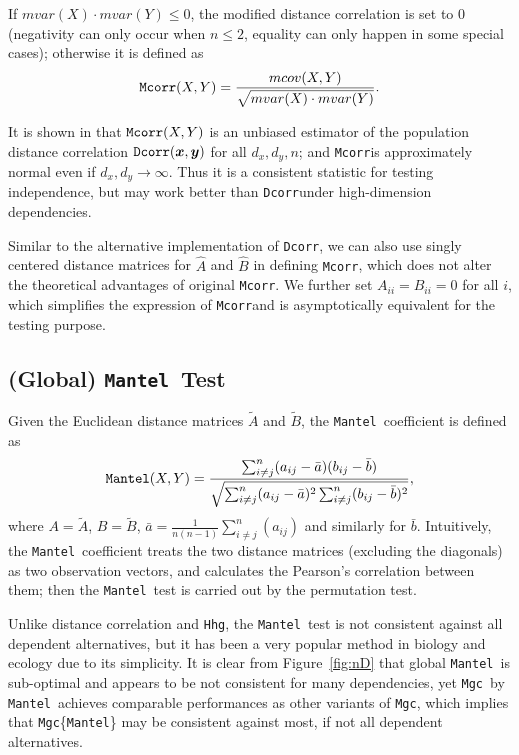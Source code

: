 \documentclass[11pt]{article}
\providecommand{\sct}[1]{{\sc \texttt{#1}}}
\providecommand{\mb}[1]{\boldsymbol{#1}}
\newcommand{\Mgc}{\sct{Mgc}}
\newcommand{\Hhg}{\sct{Hhg}}
\newcommand{\Dcorr}{\sct{Dcorr}}
\newcommand{\Mcorr}{\sct{Mcorr}}
\newcommand{\Mantel}{\sct{Mantel}}
\begin{document}
If $mvar(X) \cdot mvar(Y) \leq 0$, the modified distance correlation is set to $0$ (negativity can only occur when $n\leq 2$, equality can only happen in some special cases); otherwise it is defined as
\begin{equation}
\label{mcorrEqu}
\Mcorr(X,Y)=\frac{mcov(X,Y)}{\sqrt{mvar(X) \cdot mvar(Y)}}.
\end{equation}

It is shown in \cite{SzekelyRizzo2013a} that $\Mcorr(X,Y)$ is an unbiased estimator of the population distance correlation $\Dcorr(\mb{x},\mb{y})$ for all $d_{x}, d_{y}, n$; and \Mcorr is approximately normal even if $d_{x},d_{y} \rightarrow \infty$. Thus it is a consistent statistic for testing independence, but may work better than \Dcorr under high-dimension dependencies. 

Similar to the alternative implementation of \Dcorr, we can also use singly centered distance matrices for $\hat{A}$ and $\hat{B}$ in defining \Mcorr, which does not alter the theoretical advantages of original \Mcorr. We further set $A_{ii}=B_{ii}=0$ for all $i$, which simplifies the expression of \Mcorr and is asymptotically equivalent for the testing purpose. %

\subsection{(Global) \Mantel~Test}
\label{appen:mantel}
Given the Euclidean distance matrices $\tilde{A}$ and $\tilde{B}$, the \Mantel~coefficient \cite{Mantel1967} is defined as 
\begin{equation}
\Mantel(X,Y)=\frac{\sum_{i \neq j}^{n}(a_{ij}-\bar{a})(b_{ij}-\bar{b})}{\sqrt{\sum_{i \neq j}^{n}(a_{ij}-\bar{a})^2 \sum_{i \neq j}^{n}(b_{ij}-\bar{b})^2}},
\end{equation}
where $A=\tilde{A}$, $B=\tilde{B}$, $\bar{a}=\frac{1}{n(n-1)}\sum_{i \neq j}^{n}(a_{ij})$ and similarly for $\bar{b}$. Intuitively, the \Mantel~coefficient treats the two distance matrices (excluding the diagonals) as two observation vectors, and calculates the Pearson's correlation between them; then the \Mantel~test is carried out by the permutation test.

Unlike distance correlation and \Hhg, the \Mantel~test is not consistent against all dependent alternatives, but it has been a very popular method in biology and ecology due to its simplicity. It is clear from Figure~\ref{fig:nD} that global \Mantel~is sub-optimal and appears to be not consistent for many dependencies, yet \Mgc~by \Mantel~achieves comparable performances as other variants of \Mgc, which implies that \Mgc\{\Mantel\} may be consistent against most, if not all dependent alternatives.
\end{document}
